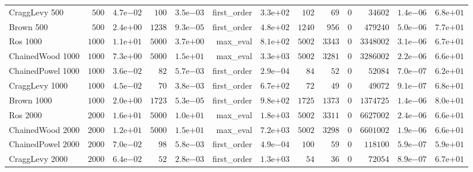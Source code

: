 \begin{longtable}[c]{lrrrrrrrrrrrr}
CraggLevy 500 & \(  500\) & \( 4.7\)e\(-02\) & \(  100\) & \( 3.5\)e\(-03\) & first\_order & \( 3.3\)e\(+02\) & \(  102\) & \(   69\) & \(    0\) & \(34602\) & \( 1.4\)e\(-06\) & \( 6.8\)e\(+01\) \\
Brown 500 & \(  500\) & \( 2.4\)e\(+00\) & \( 1238\) & \( 9.3\)e\(-05\) & first\_order & \( 4.8\)e\(+02\) & \( 1240\) & \(  956\) & \(    0\) & \(479240\) & \( 5.0\)e\(-06\) & \( 7.7\)e\(+01\) \\
Ros 1000 & \( 1000\) & \( 1.1\)e\(+01\) & \( 5000\) & \( 3.7\)e\(+00\) & max\_eval & \( 8.1\)e\(+02\) & \( 5002\) & \( 3343\) & \(    0\) & \(3348002\) & \( 3.1\)e\(-06\) & \( 6.7\)e\(+01\) \\
ChainedWood 1000 & \( 1000\) & \( 7.3\)e\(+00\) & \( 5000\) & \( 1.5\)e\(+01\) & max\_eval & \( 3.3\)e\(+03\) & \( 5002\) & \( 3281\) & \(    0\) & \(3286002\) & \( 2.2\)e\(-06\) & \( 6.6\)e\(+01\) \\
ChainedPowel 1000 & \( 1000\) & \( 3.6\)e\(-02\) & \(   82\) & \( 5.7\)e\(-03\) & first\_order & \( 2.9\)e\(-04\) & \(   84\) & \(   52\) & \(    0\) & \(52084\) & \( 7.0\)e\(-07\) & \( 6.2\)e\(+01\) \\
CraggLevy 1000 & \( 1000\) & \( 4.5\)e\(-02\) & \(   70\) & \( 3.8\)e\(-03\) & first\_order & \( 6.7\)e\(+02\) & \(   72\) & \(   49\) & \(    0\) & \(49072\) & \( 9.1\)e\(-07\) & \( 6.8\)e\(+01\) \\
Brown 1000 & \( 1000\) & \( 2.0\)e\(+00\) & \( 1723\) & \( 5.3\)e\(-05\) & first\_order & \( 9.8\)e\(+02\) & \( 1725\) & \( 1373\) & \(    0\) & \(1374725\) & \( 1.4\)e\(-06\) & \( 8.0\)e\(+01\) \\
Ros 2000 & \( 2000\) & \( 1.6\)e\(+01\) & \( 5000\) & \( 1.0\)e\(+01\) & max\_eval & \( 1.8\)e\(+03\) & \( 5002\) & \( 3311\) & \(    0\) & \(6627002\) & \( 2.4\)e\(-06\) & \( 6.6\)e\(+01\) \\
ChainedWood 2000 & \( 2000\) & \( 1.2\)e\(+01\) & \( 5000\) & \( 1.5\)e\(+01\) & max\_eval & \( 7.2\)e\(+03\) & \( 5002\) & \( 3298\) & \(    0\) & \(6601002\) & \( 1.9\)e\(-06\) & \( 6.6\)e\(+01\) \\
ChainedPowel 2000 & \( 2000\) & \( 7.0\)e\(-02\) & \(   98\) & \( 5.8\)e\(-03\) & first\_order & \( 4.9\)e\(-04\) & \(  100\) & \(   59\) & \(    0\) & \(118100\) & \( 5.9\)e\(-07\) & \( 5.9\)e\(+01\) \\
CraggLevy 2000 & \( 2000\) & \( 6.4\)e\(-02\) & \(   52\) & \( 2.8\)e\(-03\) & first\_order & \( 1.3\)e\(+03\) & \(   54\) & \(   36\) & \(    0\) & \(72054\) & \( 8.9\)e\(-07\) & \( 6.7\)e\(+01\) \\

\end{longtable}
